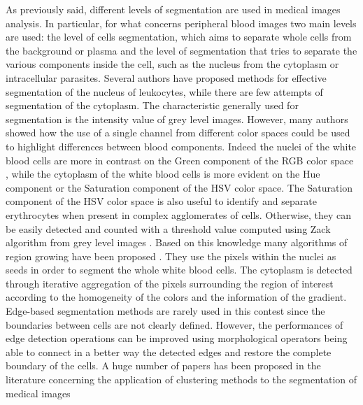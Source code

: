 \documentclass[final,a4paper,12pt,english]{UnicaPhdThesis3}
\begin{document}
As previously said, different levels of segmentation are used in medical images analysis. In particular, for what concerns peripheral blood images two main levels are used: the level of cells segmentation, which aims to separate whole cells from the background or plasma and the level of segmentation that tries to separate the various components inside the cell, such as the nucleus from the cytoplasm or intracellular parasites. Several authors have proposed methods for effective segmentation of the nucleus of leukocytes, while there are few attempts of segmentation of the cytoplasm. The characteristic generally used for segmentation is the intensity value of grey level images. However, many authors showed how the use of a single channel from different color spaces could be used to highlight differences between blood components. Indeed the nuclei of the white blood cells are more in contrast on the Green component of the RGB color space \cite{Cseke}, while the cytoplasm of the white blood cells is more evident on the Hue component \cite{Wu} or the Saturation component \cite{Halim} of the HSV color space. The Saturation component of the HSV color space is also useful to identify and separate erythrocytes \cite{DiR} when present in complex agglomerates of cells. Otherwise, they can be easily detected and counted with a threshold value computed using Zack algorithm from grey level images \cite{Berge}. Based on this knowledge many algorithms of region growing have been proposed \cite{Kovalev, Lez98, Lez02}. They use the pixels within the nuclei as seeds in order to segment the whole white blood cells. The cytoplasm is detected through iterative aggregation of the pixels surrounding the region of interest according to the homogeneity of the colors and the information of the gradient. Edge-based segmentation methods are rarely used in this contest since the boundaries between cells are not clearly defined. However, the performances of edge detection operations can be improved using morphological operators \cite{Piuri, Sco05} being able to connect in a better way the detected edges and restore the complete boundary of the cells. 
A huge number of papers has been proposed in the literature concerning the application
of clustering methods to the segmentation of medical images \cite{Karthikeyan2017}
\end{document}
